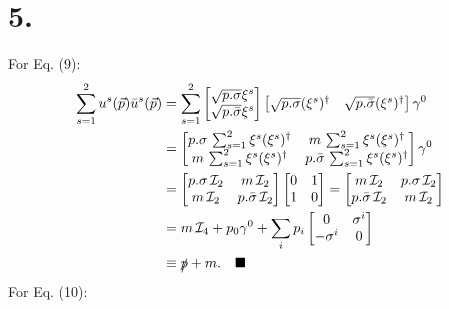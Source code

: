 \documentclass{article}
\newcommand{\vecp}{\vec{p}}
\newcommand{\slashp}{\slashed{p}}
\begin{document}
\section*{5.}
For Eq. (9):
\begin{equation}
    \begin{split}
        \sum_{s=1}^2 u^s(\vecp) \bar{u}^s(\vecp) &= \sum_{s=1}^2 \begin{bmatrix}
            \sqrt{p.\sigma}\xi^s \\ \sqrt{p.\bar{\sigma}}\xi^s
        \end{bmatrix}\begin{bmatrix}
            \sqrt{p.\sigma}(\xi^s)^\dagger & \sqrt{p.\bar{\sigma}}(\xi^s)^\dagger
        \end{bmatrix}\gamma^0 \\
        &= \begin{bmatrix}
            p.\sigma \,\sum_{s=1}^2\xi^s(\xi^s)^\dagger & m\, \sum_{s=1}^2\xi^s(\xi^s)^\dagger \\ m\, \sum_{s=1}^2\xi^s(\xi^s)^\dagger & p.\bar{\sigma} \, \sum_{s=1}^2\xi^s(\xi^s)^\dagger
        \end{bmatrix}\gamma^0 \\
        &= \begin{bmatrix}
            p.\sigma \,\mathcal{I}_2 & m\, \mathcal{I}_2 \\ m\, \mathcal{I}_2 & p.\bar{\sigma} \, \mathcal{I}_2
        \end{bmatrix}\begin{bmatrix}
            0 & 1 \\ 1 & 0
        \end{bmatrix}=\begin{bmatrix}
            m\, \mathcal{I}_2 & p.\sigma \,\mathcal{I}_2 \\
            p.\bar{\sigma} \, \mathcal{I}_2 & m\, \mathcal{I}_2
        \end{bmatrix} \\
        &= m\,\mathcal{I}_4 + p_0\gamma^0 + \sum_i p_i\begin{bmatrix}
            0 & \sigma^i \\ -\sigma^i & 0
        \end{bmatrix} \\
        &\equiv \slashp + m. \quad \blacksquare
    \end{split}
\end{equation}
For Eq. (10):
\end{document}
